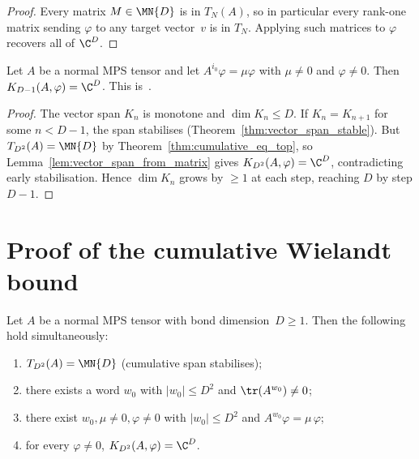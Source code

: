 \begin{proof}
    \leanok
    Every matrix $M \in \MN{D}$ is in $T_N(A)$, so in particular
    every rank-one matrix sending $\varphi$ to any target vector~$v$
    is in $T_N$.
    Applying such matrices to $\varphi$ recovers all of $\C^D$.
\end{proof}

\begin{theorem}\label{thm:eigenvector_spreading}
    \leanok
    Let $A$ be a normal MPS tensor and let
    $A^{i_0} \varphi = \mu \varphi$ with $\mu \neq 0$
    and $\varphi \neq 0$.
    Then $K_{D-1}(A, \varphi) = \C^D$.
    This is~\cite[Lemma~2(a)]{Sanz2010Quantum}.
\end{theorem}

\begin{proof}
    \leanok
    The vector span $K_n$ is monotone and $\dim K_n \le D$.
    If $K_n = K_{n+1}$ for some $n < D-1$, the span stabilises
    (Theorem~\ref{thm:vector_span_stable}).
    But $T_{D^2}(A) = \MN{D}$ by Theorem~\ref{thm:cumulative_eq_top},
    so Lemma~\ref{lem:vector_span_from_matrix} gives
    $K_{D^2}(A, \varphi) = \C^D$, contradicting early stabilisation.
    Hence $\dim K_n$ grows by $\ge 1$ at each step,
    reaching $D$ by step $D - 1$.
\end{proof}

\section{Proof of the cumulative Wielandt bound}

\begin{theorem}\label{thm:wielandt_chain}
    \leanok
    Let $A$ be a normal MPS tensor with bond dimension~$D \ge 1$.
    Then the following hold simultaneously:
    \begin{enumerate}
        \item $T_{D^2}(A) = \MN{D}$ (cumulative span stabilises);
        \item there exists a word $w_0$ with $|w_0| \le D^2$ and
              $\tr(A^{w_0}) \ne 0$;
        \item there exist $w_0, \mu \ne 0, \varphi \ne 0$ with
              $|w_0| \le D^2$ and $A^{w_0} \varphi = \mu\,\varphi$;
        \item for every $\varphi \ne 0$,
              $K_{D^2}(A, \varphi) = \C^D$.
    \end{enumerate}
\end{theorem}

